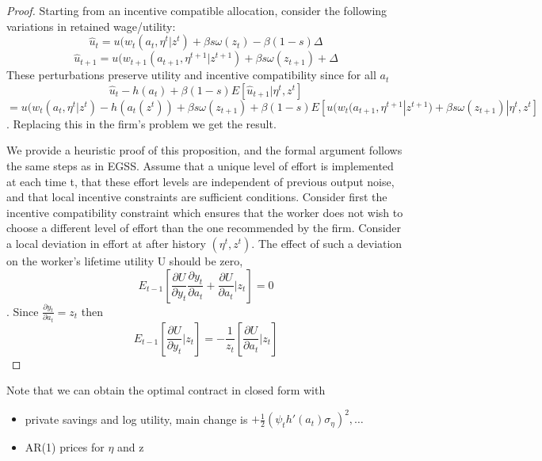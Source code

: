 \documentclass[11pt,a4paper]{article}
\begin{document}
\begin{proof}[Proof]
Starting from an incentive compatible allocation, consider the following variations in retained wage/utility:
$$\hat{u}_{t}=u(w_t(a_t,\eta^t|z^t)+\beta s \omega(z_{t})-\beta(1-s) \Delta$$
$$\hat{u}_{t+1}=u(w_{t+1}(a_{t+1},\eta^{t+1}|z^{t+1})+\beta s \omega(z_{t+1})+ \Delta$$ These perturbations preserve utility and incentive compatibility since for all $a_t$
$$\hat{u}_t - h(a_t)+\beta(1-s)E[\hat{u}_{t+1}|\eta^t,z^t]$$
$$=u(w_t(a_t,\eta^t|z^t)-h(a_t(z^t))+\beta s \omega(z_{t+1})+\beta(1-s)E[u(w_t(a_{t+1},\eta^{t+1}|z^{t+1})+\beta s \omega(z_{t+1})|\eta^t,z^t]$$. Replacing this in the firm's problem we get the result.

We provide a heuristic proof of this proposition, and the formal argument follows the same steps as in EGSS. Assume that a unique level of effort is implemented at each time t, that these effort levels are independent of previous output noise, and that local incentive constraints are sufficient conditions. Consider first the incentive compatibility constraint which ensures that the worker does not wish to choose a different level of effort than the one recommended by the firm. Consider a local deviation in effort at after history $(\eta^t,z^t)$. The effect of such a deviation on the worker's lifetime utility U should be zero,
$$E_{t-1}[\frac{\partial U}{\partial y_t}\frac{\partial y_t}{\partial a_t}+\frac{\partial U}{\partial a_t}|z_t]=0$$.
Since $\frac{\partial y_t}{\partial a_t}=z_t$ then
$$E_{t-1}[\frac{\partial U}{\partial y_t}|z_t]=-\frac{1}{z_t}[\frac{\partial U}{\partial a_t}|z_t]$$
\end{proof}

Note that we can obtain the optimal contract in closed form with
\begin{itemize}
    \item private savings and log utility, main change is $+\frac{1}{2}(\psi_t h'(a_t)\sigma_{\eta})^2,\dots$
    \item AR(1) prices for $\eta$ and z
\end{itemize}
\end{document}
